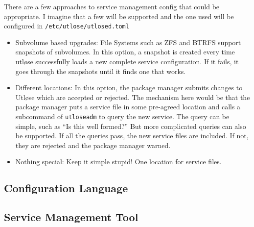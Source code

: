 \documentclass{article}
\newcommand*{\bibtitle}{Bibliography}
\begin{document}
There are a few approaches to service management config that could be appropriate. I imagine that a few will be supported and
the one used will be configured in \texttt{/etc/utlose/utlosed.toml}

\begin{itemize}
  \item{Subvolume based upgrades: File Systems such as ZFS and BTRFS support snapshots of subvolumes. In this option, a snapshot is created
    every time utløse successfully loads a new complete service configuration. If it fails, it goes through the snapshots until it finds one that
    works.}
  \item{Different locations: In this option, the package manager submits changes to Utløse which are accepted or rejected. The mechanism here would be
    that the package manager puts a service file in some pre-agreed location and calls a subcommand of \texttt{utloseadm} to query the new service.
    The query can be simple, such as ``Is this well formed?'' But more complicated queries can also be supported. If all the queries pass, the new service
    files are included. If not, they are rejected and the package manager warned.}
  \item{Nothing special: Keep it simple stupid! One location for service files.}
\end{itemize}

\subsection{Configuration Language}
\subsection{Service Management Tool}

\setlength{\baselineskip}{0pt} %

{\renewcommand*\MakeUppercase[1]{#1}%
\printbibliography[heading=bibintoc,title={\bibtitle}]}
\end{document}
